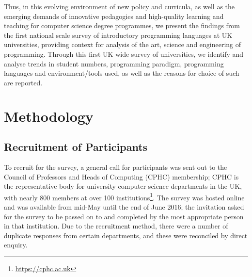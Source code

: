 \documentclass[english,submission]{programming}
\begin{document}
Thus, in this evolving environment of new policy and curricula, as
well as the emerging demands of innovative pedagogies and high-quality
learning and teaching for computer science degree programmes, we
present the findings from the first national scale survey of
introductory programming languages at UK universities, providing
context for analysis of the art, science and engineering of
programming. Through this first UK wide survey of universities, we
identify and analyse trends in student numbers, programming paradigm,
programming languages and environment/tools used, as well as the
reasons for choice of such are reported.





\section{Methodology}\label{method}

\subsection{Recruitment of Participants}

To recruit for the survey, a general call for participants was sent
out to the Council of Professors and Heads of Computing (CPHC)
membership; CPHC is the representative body for university computer
science departments in the UK, with nearly 800 members at over 100
institutions\footnote{\url{https://cphc.ac.uk}}. The
survey was hosted online and was available from mid-May until the end
of June 2016; the invitation asked for the survey to be passed on to
and completed by the most appropriate person in that institution. Due
to the recruitment method, there were a number of duplicate responses
from certain departments, and these were reconciled by direct enquiry.
\end{document}
